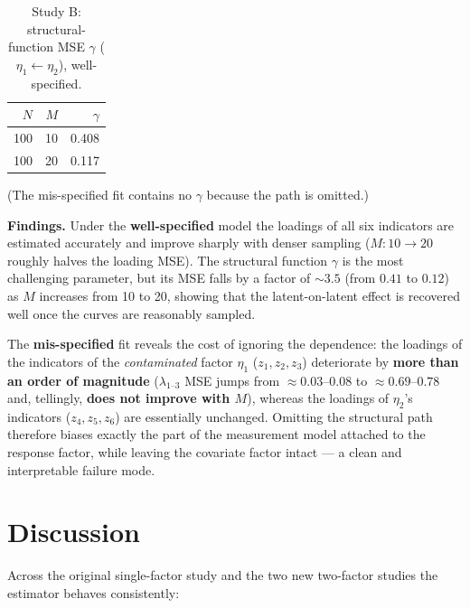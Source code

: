 \documentclass[11pt]{article}
\begin{document}
\begin{table}[ht]
\centering
\caption{Study B: structural-function MSE $\gamma$ ($\eta_1\leftarrow\eta_2$), well-specified.}
\begin{tabular}{rrr}
\toprule
$N$ & $M$ & $\gamma$ \\
\midrule
100 & 10 & 0.408 \\
100 & 20 & 0.117 \\
\bottomrule
\end{tabular}
\end{table}

\noindent (The mis-specified fit contains no $\gamma$ because the path is omitted.)

\textbf{Findings.} Under the \textbf{well-specified} model the loadings of all six
indicators are estimated accurately and improve sharply with denser sampling
($M:10\to20$ roughly halves the loading MSE). The structural function $\gamma$ is
the most challenging parameter, but its MSE falls by a factor of $\sim3.5$ (from
$0.41$ to $0.12$) as $M$ increases from 10 to 20, showing that the latent-on-latent
effect is recovered well once the curves are reasonably sampled.

The \textbf{mis-specified} fit reveals the cost of ignoring the dependence: the
loadings of the indicators of the \emph{contaminated} factor $\eta_1$
($z_1,z_2,z_3$) deteriorate by \textbf{more than an order of magnitude}
($\lambda_{1\text{--}3}$ MSE jumps from $\approx 0.03\text{--}0.08$ to
$\approx 0.69\text{--}0.78$ and, tellingly, \textbf{does not improve with $M$}),
whereas the loadings of $\eta_2$'s indicators ($z_4,z_5,z_6$) are essentially
unchanged. Omitting the structural path therefore biases exactly the part of the
measurement model attached to the response factor, while leaving the covariate
factor intact --- a clean and interpretable failure mode.

\section*{Discussion}

Across the original single-factor study and the two new two-factor studies the
estimator behaves consistently:
\end{document}
